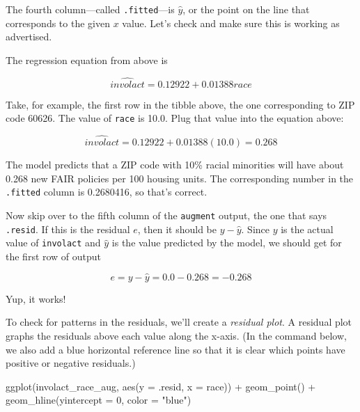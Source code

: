 \documentclass[
]{book}
\newenvironment{Shaded}{\begin{snugshade}}{\end{snugshade}}
\newcommand{\AttributeTok}[1]{\textcolor[rgb]{0.77,0.63,0.00}{#1}}
\newcommand{\DecValTok}[1]{\textcolor[rgb]{0.00,0.00,0.81}{#1}}
\newcommand{\FunctionTok}[1]{\textcolor[rgb]{0.00,0.00,0.00}{#1}}
\newcommand{\NormalTok}[1]{#1}
\newcommand{\SpecialCharTok}[1]{\textcolor[rgb]{0.00,0.00,0.00}{#1}}
\newcommand{\StringTok}[1]{\textcolor[rgb]{0.31,0.60,0.02}{#1}}
\begin{document}
The fourth column---called \texttt{.fitted}---is \(\hat{y}\), or the point on the line that corresponds to the given \(x\) value. Let's check and make sure this is working as advertised.

The regression equation from above is

\[
\widehat{involact} = 0.12922 + 0.01388 race
\]

Take, for example, the first row in the tibble above, the one corresponding to ZIP code 60626. The value of \texttt{race} is 10.0. Plug that value into the equation above:

\[
\widehat{involact} = 0.12922 + 0.01388(10.0) = 0.268
\]

The model predicts that a ZIP code with 10\% racial minorities will have about 0.268 new FAIR policies per 100 housing units. The corresponding number in the \texttt{.fitted} column is 0.2680416, so that's correct.

Now skip over to the fifth column of the \texttt{augment} output, the one that says \texttt{.resid}. If this is the residual \(e\), then it should be \(y - \hat{y}\). Since \(y\) is the actual value of \texttt{involact} and \(\hat{y}\) is the value predicted by the model, we should get for the first row of output

\[
e = y - \hat{y} = 0.0 - 0.268 = -0.268
\]

Yup, it works!

To check for patterns in the residuals, we'll create a \emph{residual plot}. A residual plot graphs the residuals above each value along the x-axis. (In the command below, we also add a blue horizontal reference line so that it is clear which points have positive or negative residuals.)

\begin{Shaded}
\begin{Highlighting}[]
\FunctionTok{ggplot}\NormalTok{(involact\_race\_aug, }\FunctionTok{aes}\NormalTok{(}\AttributeTok{y =}\NormalTok{ .resid, }\AttributeTok{x =}\NormalTok{ race)) }\SpecialCharTok{+}
    \FunctionTok{geom\_point}\NormalTok{() }\SpecialCharTok{+}
    \FunctionTok{geom\_hline}\NormalTok{(}\AttributeTok{yintercept =} \DecValTok{0}\NormalTok{, }\AttributeTok{color =} \StringTok{"blue"}\NormalTok{)}
\end{Highlighting}
\end{Shaded}
\end{document}
